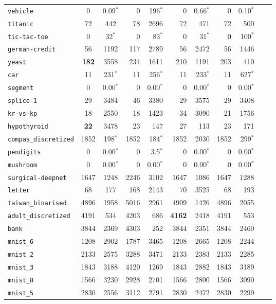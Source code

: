 \begin{tabular}{lccrrrrrrrr}
\texttt{vehicle} & 0 & 0.09$^*$ & 0 & 196$^*$ & 0 & 0.66$^*$ & 0 & 0.10$^*$\\
\texttt{titanic} & 72 & 442 & 78 & 2696 & 72 & 471 & 72 & 500\\
\texttt{tic-tac-toe} & 0 & 32$^*$ & 0 & 83$^*$ & 0 & 31$^*$ & 0 & 100$^*$\\
\texttt{german-credit} & 56 & 1192 & 117 & 2789 & 56 & 2472 & 56 & 1446\\
\texttt{yeast} & \textbf{182} & 3558 & 234 & 1611 & 210 & 1191 & 203 & 410\\
\texttt{car} & 11 & 231$^*$ & 11 & 256$^*$ & 11 & 233$^*$ & 11 & 627$^*$\\
\texttt{segment} & 0 & 0.00$^*$ & 0 & 0.00$^*$ & 0 & 0.00$^*$ & 0 & 0.00$^*$\\
\texttt{splice-1} & 29 & 3484 & 46 & 3380 & 29 & 3575 & 29 & 3408\\
\texttt{kr-vs-kp} & 18 & 2550 & 18 & 1423 & 34 & 3090 & 21 & 1756\\
\texttt{hypothyroid} & \textbf{22} & 3478 & 23 & 147 & 27 & 113 & 23 & 171\\
\texttt{compas\_discretized} & 1852 & 198$^*$ & 1852 & 184$^*$ & 1852 & 2030 & 1852 & 299$^*$\\
\texttt{pendigits} & 0 & 0.00$^*$ & 0 & 3.5$^*$ & 0 & 0.00$^*$ & 0 & 0.00$^*$\\
\texttt{mushroom} & 0 & 0.00$^*$ & 0 & 0.00$^*$ & 0 & 0.00$^*$ & 0 & 0.00$^*$\\
\texttt{surgical-deepnet} & 1647 & 1248 & 2246 & 3102 & 1647 & 1086 & 1647 & 1288\\
\texttt{letter} & 68 & 177 & 168 & 2143 & 70 & 3525 & 68 & 193\\
\texttt{taiwan\_binarised} & 4896 & 1958 & 5016 & 2961 & 4909 & 1426 & 4896 & 2055\\
\texttt{adult\_discretized} & 4191 & 534 & 4203 & 686 & \textbf{4162} & 2418 & 4191 & 553\\
\texttt{bank} & 3844 & 2369 & 4303 & 252 & 3844 & 2351 & 3844 & 2460\\
\texttt{mnist\_6} & 1208 & 2902 & 1787 & 3465 & 1208 & 2665 & 1208 & 2244\\
\texttt{mnist\_2} & 2133 & 2575 & 3288 & 3471 & 2133 & 2383 & 2133 & 2285\\
\texttt{mnist\_3} & 1843 & 3188 & 4120 & 1269 & 1843 & 2882 & 1843 & 3189\\
\texttt{mnist\_8} & 1566 & 3230 & 2928 & 2701 & 1566 & 2800 & 1566 & 3090\\
\texttt{mnist\_5} & 2830 & 2556 & 3112 & 2791 & 2830 & 2472 & 2830 & 2299\\

\end{tabular}
